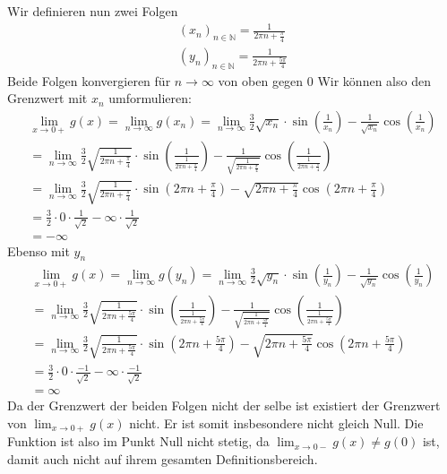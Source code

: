 \documentclass{article}
\begin{document}
    Wir definieren nun zwei Folgen
    \begin{gather*}
        {(x_n)}_{n \in \mathbb{N}} = \frac{1}{2 \pi n + \frac{\pi}{4}} \\
        {(y_n)}_{n \in \mathbb{N}} = \frac{1}{2 \pi n + \frac{5 \pi}{4}}
    \end{gather*}
    Beide Folgen konvergieren für \(n \to \infty \) von oben gegen 0
    Wir können also den Grenzwert mit \(x_n\) umformulieren:
    \begin{gather*}
        \lim_{x \to 0 +} g(x) = \lim_{n \to \infty} g(x_n) = \lim_{n \to \infty} \frac{3}{2} \sqrt{x_n} \cdot \sin(\frac{1}{x_n}) - \frac{1}{\sqrt{x_n}} \cos(\frac{1}{x_n}) \\
        = \lim_{n \to \infty} \frac{3}{2} \sqrt{\frac{1}{2 \pi n + \frac{\pi}{4}}} \cdot \sin(\frac{1}{\frac{1}{2 \pi n + \frac{\pi}{4}}}) - \frac{1}{\sqrt{\frac{1}{2 \pi n + \frac{\pi}{4}}}} \cos(\frac{1}{\frac{1}{2 \pi n + \frac{\pi}{4}}}) \\
        = \lim_{n \to \infty} \frac{3}{2} \sqrt{\frac{1}{2 \pi n + \frac{\pi}{4}}} \cdot \sin(2 \pi n + \frac{\pi}{4}) - \sqrt{2 \pi n + \frac{\pi}{4}} \cos(2 \pi n + \frac{\pi}{4}) \\
        = \frac{3}{2} \cdot 0 \cdot \frac{1}{\sqrt{2}} - \infty \cdot \frac{1}{\sqrt{2}} \\
        = - \infty
    \end{gather*}
    Ebenso mit \(y_n\)
    \begin{gather*}
        \lim_{x \to 0 +} g(x) = \lim_{n \to \infty} g(y_n) = \lim_{n \to \infty} \frac{3}{2} \sqrt{y_n} \cdot \sin(\frac{1}{y_n}) - \frac{1}{\sqrt{y_n}} \cos(\frac{1}{y_n}) \\
        = \lim_{n \to \infty} \frac{3}{2} \sqrt{\frac{1}{2 \pi n + \frac{5 \pi}{4}}} \cdot \sin(\frac{1}{\frac{1}{2 \pi n + \frac{5 \pi}{4}}}) - \frac{1}{\sqrt{\frac{1}{2 \pi n + \frac{5 \pi}{4}}}} \cos(\frac{1}{\frac{1}{2 \pi n + \frac{5 \pi}{4}}}) \\
        = \lim_{n \to \infty} \frac{3}{2} \sqrt{\frac{1}{2 \pi n + \frac{5 \pi}{4}}} \cdot \sin(2 \pi n + \frac{5 \pi}{4}) - \sqrt{2 \pi n + \frac{5 \pi}{4}} \cos(2 \pi n + \frac{5 \pi}{4}) \\
        = \frac{3}{2} \cdot 0 \cdot \frac{-1}{\sqrt{2}} - \infty \cdot \frac{-1}{\sqrt{2}} \\
        = \infty
    \end{gather*}
    Da der Grenzwert der beiden Folgen nicht der selbe ist existiert der Grenzwert von \(\lim_{x \to 0 +} g(x)\) nicht. Er ist somit insbesondere nicht gleich Null.
    Die Funktion ist also im Punkt Null nicht stetig, da \(\lim_{x \to 0 -} g(x) \neq g(0)\) ist, damit auch nicht auf ihrem gesamten Definitionsbereich.
\end{document}
